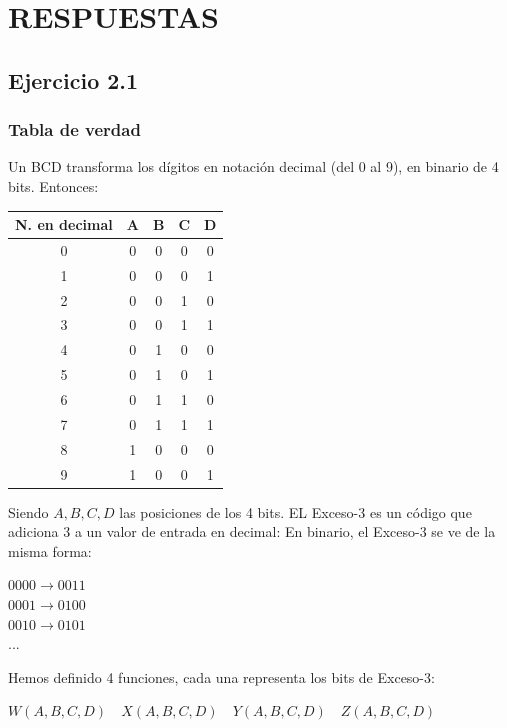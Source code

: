 \section{RESPUESTAS}
\subsection{Ejercicio 2.1}
\subsubsection{Tabla de verdad}
\sangria{} Un BCD transforma los dígitos en notación decimal (del 0 al 9), en binario de 4 bits. Entonces:
\begin{center}
\begin{tabular}{c|cccc}
\rowcolor[HTML]{FFFC9E} 
N. en decimal & A & B & C & D \\ \hline
0             & 0 & 0 & 0 & 0 \\
1             & 0 & 0 & 0 & 1 \\
2             & 0 & 0 & 1 & 0 \\
3             & 0 & 0 & 1 & 1 \\
4             & 0 & 1 & 0 & 0 \\
5             & 0 & 1 & 0 & 1 \\
6             & 0 & 1 & 1 & 0 \\
7             & 0 & 1 & 1 & 1 \\
8             & 1 & 0 & 0 & 0 \\
9             & 1 & 0 & 0 & 1
\end{tabular}
\end{center}
Siendo $A,B,C,D$ las posiciones de los 4 bits. EL Exceso-3 es un código que adiciona $3$ a un valor de entrada en decimal:
En binario, el Exceso-3 se ve de la misma forma:
\begin{center}
$0000 \rightarrow 0011$ \\
$0001 \rightarrow 0100$ \\
$0010 \rightarrow 0101$ \\
$...$
\end{center}
\noindent{}Hemos definido 4 funciones, cada una representa los bits de Exceso-3:
\begin{center}
    $W(A,B,C,D) \quad X(A,B,C,D) \quad Y(A,B,C,D) \quad Z(A,B,C,D)$
\end{center}

